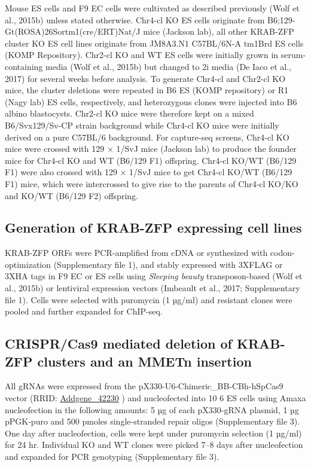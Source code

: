 \documentclass[11pt,a4paper]{article}
\begin{document}
Mouse ES cells and F9 EC cells were cultivated as described previously (Wolf et al., 2015b) unless stated otherwise. Chr4-cl KO ES cells originate from B6;129‐ Gt(ROSA)26Sortm1(cre/ERT)Nat/J mice (Jackson lab), all other KRAB-ZFP cluster KO ES cell lines originate from JM8A3.N1 C57BL/6N-A tm1Brd ES cells (KOMP Repository). Chr2-cl KO and WT ES cells were initially grown in serum-containing media (Wolf et al., 2015b) but changed to 2i media (De Iaco et al., 2017) for several weeks before analysis. To generate Chr4-cl and Chr2-cl KO mice, the cluster deletions were repeated in B6 ES (KOMP repository) or R1 (Nagy lab) ES cells, respectively, and heterozygous clones were injected into B6 albino blastocysts. Chr2-cl KO mice were therefore kept on a mixed B6/Svx129/Sv-CP strain background while Chr4-cl KO mice were initially derived on a pure C57BL/6 background. For capture-seq screens, Chr4-cl KO mice were crossed with 129 × 1/SvJ mice (Jackson lab) to produce the founder mice for Chr4-cl KO and WT (B6/129 F1) offspring. Chr4-cl KO/WT (B6/129 F1) were also crossed with 129 × 1/SvJ mice to get Chr4-cl KO/WT (B6/129 F1) mice, which were intercrossed to give rise to the parents of Chr4-cl KO/KO and KO/WT (B6/129 F2) offspring.

\subsection{Generation of KRAB-ZFP expressing cell lines}

KRAB-ZFP ORFs were PCR-amplified from cDNA or synthesized with codon-optimization (Supplementary file 1), and stably expressed with 3XFLAG or 3XHA tags in F9 EC or ES cells using \textit{Sleeping beauty} transposon-based (Wolf et al., 2015b) or lentiviral expression vectors (Imbeault et al., 2017; Supplementary file 1). Cells were selected with puromycin (1 µg/ml) and resistant clones were pooled and further expanded for ChIP-seq.

\subsection{CRISPR/Cas9 mediated deletion of KRAB-ZFP clusters and an MMETn insertion}

All gRNAs were expressed from the pX330-U6-Chimeric\_BB-CBh-hSpCas9 vector (RRID: \href{https://scicrunch.org/resolver/Addgene\_42230}{Addgene\_42230} ) and nucleofected into 10 6 ES cells using Amaxa nucleofection in the following amounts: 5 µg of each pX330-gRNA plasmid, 1 µg pPGK-puro and 500 pmoles single-stranded repair oligos (Supplementary file 3). One day after nucleofection, cells were kept under puromycin selection (1 µg/ml) for 24 hr. Individual KO and WT clones were picked 7–8 days after nucleofection and expanded for PCR genotyping (Supplementary file 3).
\end{document}
